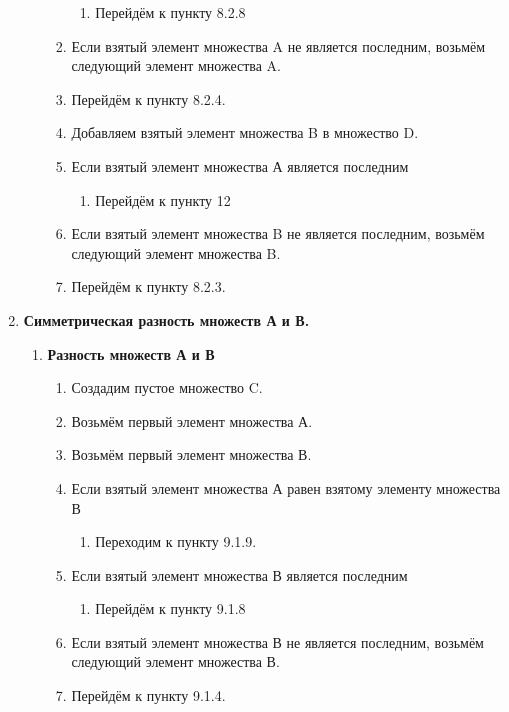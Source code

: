 \documentclass[a4paper,12pt]{extarticle}
\begin{document}
\begin{enumerate}
\begin{enumerate}[label*=\arabic*.]
\begin{enumerate}[label*=\arabic*.]
    \begin{enumerate}[label*=\arabic*.]
      \item Перейдём к пункту 8.2.8
    \end{enumerate}
    \item Если взятый элемент множества A не является последним, возьмём следующий элемент множества A.
    \item Перейдём к пункту 8.2.4.
    \item Добавляем взятый элемент множества B в множество D.
    \item Если взятый элемент множества А является последним
    \begin{enumerate}[label*=\arabic*.]
      \item Перейдём к пункту 12
    \end{enumerate}
    \item Если взятый элемент множества B не является последним, возьмём следующий элемент множества B.
    \item Перейдём к пункту 8.2.3.
  \end{enumerate}
  \end{enumerate}
  \item \textbf{Симметрическая разность множеств А и В.}
  \begin{enumerate}[label*=\arabic*.]
    \item \textbf{Разность множеств А и В}
    \begin{enumerate}[label*=\arabic*.]
      \item Создадим пустое множество C.
      \item Возьмём первый элемент множества А.
      \item Возьмём первый элемент множества В.
      \item Если взятый элемент множества А равен взятому элементу множества В
      \begin{enumerate}[label*=\arabic*.]
        \item Переходим к пункту 9.1.9.
      \end{enumerate}
      \item Если взятый элемент множества В является последним
      \begin{enumerate}[label*=\arabic*.]
        \item Перейдём к пункту 9.1.8
      \end{enumerate}
      \item Если взятый элемент множества В не является последним, возьмём следующий элемент множества В.
      \item Перейдём к пункту 9.1.4.

\end{enumerate}
\end{enumerate}
\end{enumerate}
\end{document}
